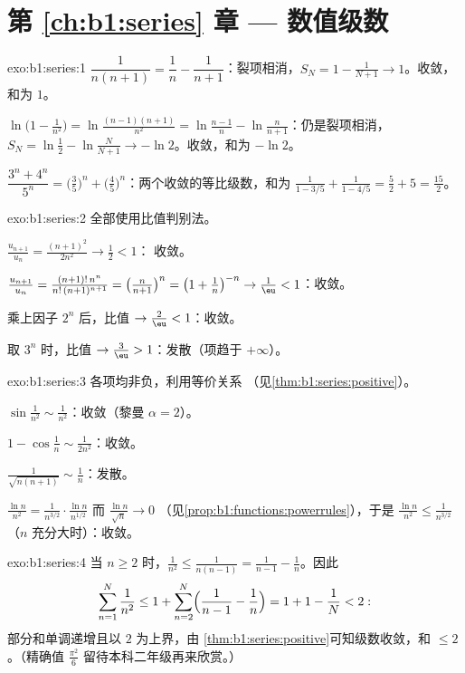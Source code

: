 \section*{第 \ref{ch:b1:series} 章 --- 数值级数}

\begin{solution}{exo:b1:series:1}
$\dfrac{1}{n(n+1)} = \dfrac1n - \dfrac{1}{n+1}$：裂项相消，$S_N =
1 - \frac{1}{N+1} \to 1$。收敛，和为 $1$。

$\ln\bigl(1 - \frac{1}{n^2}\bigr) = \ln\frac{(n-1)(n+1)}{n^2} =
\ln\frac{n-1}{n} - \ln\frac{n}{n+1}$：仍是裂项相消，$S_N =
\ln\frac12 - \ln\frac{N}{N+1} \to -\ln 2$。收敛，和为 $-\ln 2$。

$\dfrac{3^n + 4^n}{5^n} = \bigl(\frac35\bigr)^n +
\bigl(\frac45\bigr)^n$：两个收敛的等比级数，和为
$\frac{1}{1 - 3/5} + \frac{1}{1 - 4/5} = \frac52 + 5 = \frac{15}{2}$。
\end{solution}

\begin{solution}{exo:b1:series:2}
全部使用比值判别法。

$\frac{u_{n+1}}{u_n} = \frac{(n+1)^2}{2n^2} \to \frac12 < 1$：
收敛。

$\frac{u_{n+1}}{u_n} = \frac{(n+1)!\,n^n}{n!\,(n+1)^{n+1}} =
\bigl(\frac{n}{n+1}\bigr)^n = \bigl(1 + \frac1n\bigr)^{-n} \to
\frac1\eu < 1$：收敛。

乘上因子 $2^n$ 后，比值 $\to \frac2\eu < 1$：收敛。

取 $3^n$ 时，比值 $\to \frac3\eu > 1$：发散（项趋于
$+\infty$）。
\end{solution}

\begin{solution}{exo:b1:series:3}
各项均非负，利用等价关系
（见\cref{thm:b1:series:positive}）。

$\sin\frac{1}{n^2} \sim \frac{1}{n^2}$：收敛（黎曼 $\alpha
= 2$）。

$1 - \cos\frac1n \sim \frac{1}{2n^2}$：收敛。

$\frac{1}{\sqrt{n(n+1)}} \sim \frac1n$：发散。

$\frac{\ln n}{n^2} = \frac{1}{n^{3/2}}\cdot\frac{\ln n}{n^{1/2}}$
而 $\frac{\ln n}{\sqrt n} \to 0$
（见\cref{prop:b1:functions:powerrules}），于是 $\frac{\ln n}{n^2} \leq
\frac{1}{n^{3/2}}$（$n$ 充分大时）：收敛。
\end{solution}

\begin{solution}{exo:b1:series:4}
当 $n \geq 2$ 时，$\frac{1}{n^2} \leq \frac{1}{n(n-1)} =
\frac{1}{n-1} - \frac1n$。因此
\[
\sum_{n=1}^{N} \frac{1}{n^2} \leq 1 + \sum_{n=2}^{N}
\Bigl(\frac{1}{n-1} - \frac1n\Bigr) = 1 + 1 - \frac1N < 2 :
\]
部分和单调递增且以 $2$ 为上界，由
\cref{thm:b1:series:positive}可知级数收敛，和 $\leq 2$。（精确值
$\frac{\pi^2}{6}$ 留待本科二年级再来欣赏。）
\end{solution}

